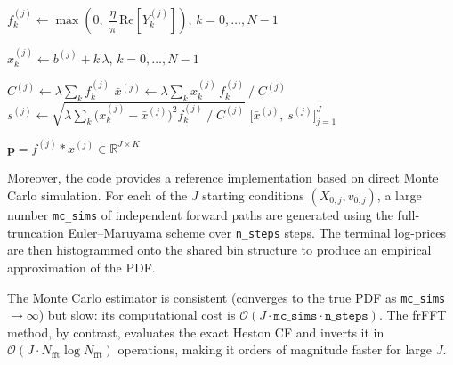 \begin{algorithm}[H]
\begin{algorithmic}[1]
\STATE $f^{(j)}_k \leftarrow
       \max\!\left(0,\;
         \dfrac{\eta}{\pi}\,\mathrm{Re}\!\left[Y^{(j)}_k\right]
       \right)$,\quad
       $k = 0,\ldots,N-1$

\STATE $x^{(j)}_k \leftarrow b^{(j)} + k\,\lambda$,\quad
       $k = 0,\ldots,N-1$

        \STATE $C^{(j)} \leftarrow \lambda\sum_{k} f^{(j)}_k$
        \STATE $\bar{x}^{(j)} \leftarrow
               \lambda\sum_{k} x^{(j)}_k\,f^{(j)}_k \;/\; C^{(j)}$
        \STATE $s^{(j)} \leftarrow
               \sqrt{\lambda\sum_{k}
                 \bigl(x^{(j)}_k - \bar{x}^{(j)}\bigr)^{2}
                 f^{(j)}_k \;/\; C^{(j)}}$
    \ENDFOR
    \RETURN $\bigl[\bar{x}^{(j)},\,s^{(j)}\bigr]_{j=1}^{J}$
\ENDIF

\RETURN $\mathbf{p} = f^{(j)} * x^{(j)} \in \mathbb{R}^{J \times K}$

\end{algorithmic}
\end{algorithm}

Moreover, the code provides a reference implementation based on direct Monte Carlo simulation. For each of the $J$ starting conditions $(X_{0,j}, v_{0,j})$, a large number \texttt{mc\_sims} of independent forward paths are generated using the full-truncation Euler--Maruyama scheme over \texttt{n\_steps} steps. The terminal log-prices are then histogrammed onto the shared bin structure to produce an empirical approximation of the PDF.

The Monte Carlo estimator is consistent (converges to the true PDF as \texttt{mc\_sims} $\to\infty$) but slow: its computational cost is $\mathcal{O}(J \cdot \texttt{mc\_sims} \cdot \texttt{n\_steps})$. The frFFT method, by contrast, evaluates the exact Heston CF and inverts it in $\mathcal{O}(J \cdot N_\text{fft}\log N_\text{fft})$ operations, making it orders of magnitude faster for large $J$.

